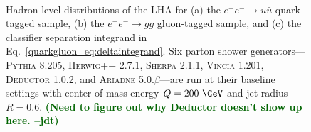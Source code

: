 \documentclass[11pt]{cernrep}
\newcommand{\jdt}[1]{\textbf{\textcolor{darkgreen}{(#1 --jdt)}}}
\begin{document}
\begin{figure}
\centering
{}
$\qquad$

\caption{Hadron-level distributions of the LHA for (a) the $e^+ e^- \to u \bar{u}$ quark-tagged sample, (b) the $e^+ e^- \to gg$ gluon-tagged sample, and (c) the classifier separation integrand in Eq.~\eqref{quarkgluon_eq:deltaintegrand}.  Six parton shower generators---\textsc{Pythia 8.205}, \textsc{Herwig++ 2.7.1}, \textsc{Sherpa 2.1.1}, \textsc{Vincia 1.201}, \textsc{Deductor 1.0.2}, and \textsc{Ariadne 5.0.$\beta$}---are run at their baseline settings with center-of-mass energy $Q = 200~\GeV$ and jet radius $R= 0.6$. \jdt{Need to figure out why Deductor doesn't show up here.}}
\label{quarkgluon_fig:LHA_hadron}
\end{figure}
\end{document}
